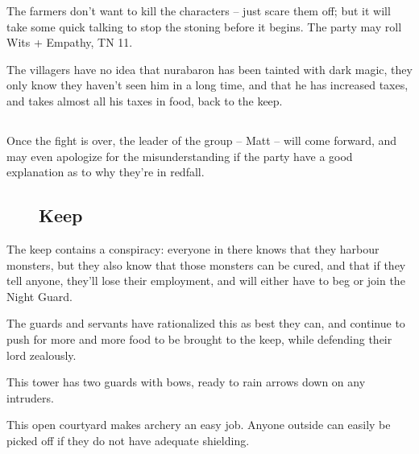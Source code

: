 The farmers don't want to kill the characters -- just scare them off; but it will take some quick talking to stop the stoning before it begins.  The party may roll Wits + Empathy, TN 11.

The villagers have no idea that \gls{nurabaron} has been tainted with dark magic, they only know they haven't seen him in a long time, and that he has increased taxes, and takes almost all his taxes in food, back to the keep.


\humanfarmer

\subsection{}

Once the fight is over, the leader of the group -- Matt -- will come forward, and may even apologize for the misunderstanding if the party have a good explanation as to why they're in \gls{redfall}.

\begin{figure}
	\subsection*{ Keep}
\vspace{-2cm}

\label{redfall_keep_map}

\end{figure}

\setcounter{list}{0}

The keep contains a conspiracy: everyone in there knows that they harbour monsters, but they also know that those monsters can be cured, and that if they tell anyone, they'll lose their employment, and will either have to beg or join the Night Guard.

The guards and servants have rationalized this as best they can, and continue to push for more and more food to be brought to the keep, while defending their lord zealously.


This tower has two guards with bows, ready to rain arrows down on any intruders.


\humanarcher


This open courtyard makes archery an easy job.  Anyone outside can easily be picked off if they do not have adequate shielding.

